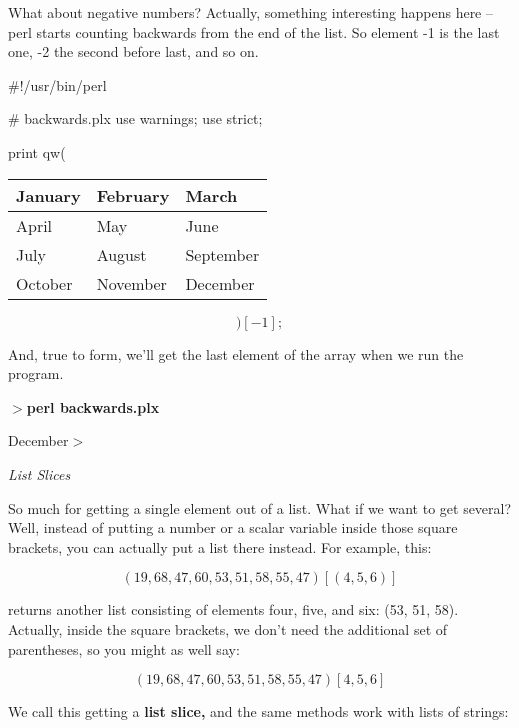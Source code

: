 \documentclass[a4paper,11pt]{book}
\begin{document}
\noindent 

\noindent What about negative numbers? Actually, something interesting happens here -- perl starts counting backwards from the end of the list. So element -1 is the last one, -2 the second before last, and so on.

\noindent 

\noindent \#!/usr/bin/perl

\noindent \# backwards.plx use warnings; use strict;

\noindent 

\noindent print qw(

\begin{tabular}{|p{1.0in}|p{0.6in}|p{2.5in}|} \hline 
January & February & March \\ \hline 
April & May & June \\ \hline 
July & August & September \\ \hline 
October & November & December \\ \hline 
\end{tabular}



\[)[-1];\] 

\noindent And, true to form, we'll get the last element of the array when we run the program.

\noindent 

\noindent $>$\textbf{perl backwards.plx}

\noindent December$>$

\noindent 

\noindent \textit{List Slices}

\noindent So much for getting a single element out of a list. What if we want to get several? Well, instead of putting a number or a scalar variable inside those square brackets, you can actually put a list there instead. For example, this:

\noindent 

\[(19, 68, 47, 60, 53, 51, 58, 55, 47)[(4, 5, 6)]\] 


\noindent returns another list consisting of elements four, five, and six: (53, 51, 58). Actually, inside the square brackets, we don't need the additional set of parentheses, so you might as well say:

\noindent 

\[(19, 68, 47, 60, 53, 51, 58, 55, 47)[4, 5, 6]\] 


\noindent We call this getting a \textbf{list slice, }and the same methods work with lists of strings:
\end{document}
